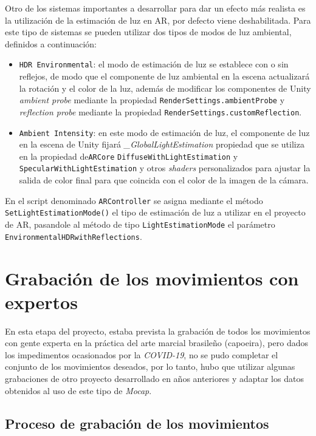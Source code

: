 Otro de los sistemas importantes a desarrollar para dar un efecto más realista es la utilización de la estimación de luz en AR, por defecto viene deshabilitada. Para este tipo de sistemas se pueden utilizar dos tipos de modos de luz ambiental, definidos a continuación:

\begin{itemize}
    \item \texttt{HDR Environmental}: el modo de estimación de luz se establece con o sin reflejos, de modo que el componente de luz ambiental en la escena actualizará la rotación y el color de la luz, además de modificar los componentes de Unity \textit{ambient probe} mediante la propiedad \texttt{RenderSettings.ambientProbe} y \textit{reflection probe} mediante la propiedad \texttt{RenderSettings.customReflection}.
    \item \texttt{Ambient Intensity}: en este modo de estimación de luz, el componente de luz en la escena de Unity fijará \textit{\_GlobalLightEstimation} propiedad que se utiliza en la propiedad de\texttt{ARCore}  \texttt{DiffuseWithLightEstimation} y \texttt{SpecularWithLightEstimation} y otros \textit{shaders} personalizados para ajustar la salida de color final para que coincida con el color de la imagen de la cámara.
\end{itemize}

En el script denominado \texttt{ARController} se asigna mediante el método \texttt{SetLightEstimationMode()} el tipo de estimación de luz a utilizar en el proyecto de AR, pasandole al método de tipo \texttt{LightEstimationMode} el parámetro \texttt{EnvironmentalHDRwithReflections}.


\section{Grabación de los movimientos con expertos}

En esta etapa del proyecto, estaba prevista la grabación de todos los movimientos con gente experta en la práctica del arte marcial brasileño (capoeira), pero dados los impedimentos ocasionados por la \textit{COVID-19}, no se pudo completar el conjunto de los movimientos deseados, por lo tanto, hubo que utilizar algunas grabaciones de otro proyecto desarrollado en años anteriores \cite{VIC} y adaptar los datos obtenidos al uso de este tipo de \textit{Mocap}.

\subsection{Proceso de grabación de los movimientos}

